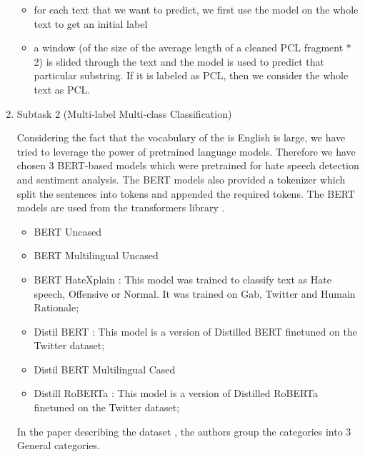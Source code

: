 \documentclass[11pt]{article}
\begin{document}
\begin{enumerate}
\begin{itemize}
		      \item for each text that we want to predict, we first use the model on the
		            whole text to get an initial label

		      \item a window (of the size of the average length of a cleaned PCL fragment
		            * 2) is slided through the text and the model is used to predict that
		            particular substring. If it is labeled as PCL, then we consider the whole
		            text as PCL.
	      \end{itemize}

	\item Subtask 2 (Multi-label Multi-class Classification)

	      Considering the fact that the vocabulary of the is English is large,
	      we have tried to leverage the power of pretrained language models.
	      Therefore we have chosen 3 BERT-based models which were pretrained
	      for hate speech detection and sentiment analysis. The BERT models
	      also provided a tokenizer which split the sentences into tokens and
	      appended the required tokens. The BERT models are used from the
	      transformers library \cite{huggingface}.

	      \begin{itemize}
		      \item BERT \cite{bert} Uncased

		      \item  BERT Multilingual Uncased

		      \item BERT HateXplain \cite{mathew2020hatexplain}: This model was
		            trained to classify text as Hate speech, Offensive or Normal.
		            It was trained on Gab, Twitter and Humain Rationale;

		      \item Distil BERT : This model is a version of Distilled BERT
		            finetuned on the Twitter dataset;

		      \item Distil BERT Multilingual Cased \cite{DistilBERT}

		      \item Distill RoBERTa : This model is a version of Distilled
		            RoBERTa finetuned on the Twitter dataset;
	      \end{itemize}

	      In the paper describing the dataset \cite{perezalmendros2020dont},
	      the authors group the categories into 3 General categories.


\end{enumerate}
\end{document}
